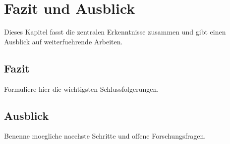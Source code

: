\section{Fazit und Ausblick}

Dieses Kapitel fasst die zentralen Erkenntnisse zusammen und gibt einen
Ausblick auf weiterfuehrende Arbeiten.

\subsection{Fazit}

Formuliere hier die wichtigsten Schlussfolgerungen.

\subsection{Ausblick}

Benenne moegliche naechste Schritte und offene Forschungsfragen.
